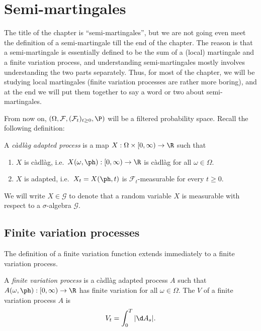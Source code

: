 \documentclass[a4paper]{article}
\begin{document}
\section{Semi-martingales}
The title of the chapter is ``semi-martingales'', but we are not going even meet the definition of a semi-martingale till the end of the chapter. The reason is that a semi-martingale is essentially defined to be the sum of a (local) martingale and a finite variation process, and understanding semi-martingales mostly involves understanding the two parts separately. Thus, for most of the chapter, we will be studying local martingales (finite variation processes are rather more boring), and at the end we will put them together to say a word or two about semi-martingales.

From now on, $(\Omega, \mathcal{F}, (\mathcal{F}_t)_{t \geq 0}, \P)$ will be a filtered probability space. Recall the following definition:

\begin{defi}
  A \emph{c\`adl\`ag adapted process} is a map $X: \Omega \times [0, \infty) \to \R$ such that
  \begin{enumerate}
    \item $X$ is c\`adl\`ag, i.e.\ $X(\omega, \ph): [0, \infty) \to \R$ is c\`adl\`ag for all $\omega \in \Omega$.
    \item $X$ is adapted, i.e.\ $X_t = X(\ph, t) $ is $\mathcal{F}_t$-measurable for every $t \geq 0$.
  \end{enumerate}
\end{defi}

\begin{notation}
  We will write $X \in \mathcal{G}$ to denote that a random variable $X$ is measurable with respect to a $\sigma$-algebra $\mathcal{G}$.
\end{notation}

\subsection{Finite variation processes}
The definition of a finite variation function extends immediately to a finite variation process.
\begin{defi}
  A \emph{finite variation process} is a c\`adl\`ag adapted process $A$ such that $A(\omega, \ph): [0, \infty) \to \R$ has finite variation for all $\omega \in \Omega$. The  $V$ of a finite variation process $A$ is
  \[
    V_t = \int_0^T |\d A_s|.
  \]
\end{defi}
\end{document}
